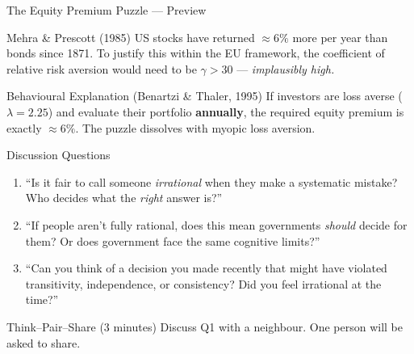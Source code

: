\documentclass[aspectratio=169]{beamer}
\begin{document}
\begin{frame}{The Equity Premium Puzzle --- Preview}
\begin{block}{Mehra \& Prescott (1985)}
US stocks have returned $\approx 6\%$ more per year than bonds since 1871. To justify this within the EU framework, the coefficient of relative risk aversion would need to be $\gamma > 30$ --- \textit{implausibly high.}
\end{block}
\begin{exampleblock}{Behavioural Explanation (Benartzi \& Thaler, 1995)}
If investors are loss averse ($\lambda = 2.25$) and evaluate their portfolio \textbf{annually}, the required equity premium is exactly $\approx 6\%$. The puzzle dissolves with myopic loss aversion.
\end{exampleblock}
\end{frame}

\begin{frame}{Discussion Questions}
\begin{enumerate}
  \item[\textcolor{bepurple}{Q1.}] ``Is it fair to call someone \textit{irrational} when they make a systematic mistake? Who decides what the \textit{right} answer is?''
  \medskip
  \item[\textcolor{beteal}{Q2.}] ``If people aren't fully rational, does this mean governments \textit{should} decide for them? Or does government face the same cognitive limits?''
  \medskip
  \item[\textcolor{berust}{Q3.}] ``Can you think of a decision you made recently that might have violated transitivity, independence, or consistency? Did you feel irrational at the time?''
\end{enumerate}
\medskip
\begin{block}{Think--Pair--Share (3 minutes)}
Discuss Q1 with a neighbour. One person will be asked to share.
\end{block}
\end{frame}
\end{document}
